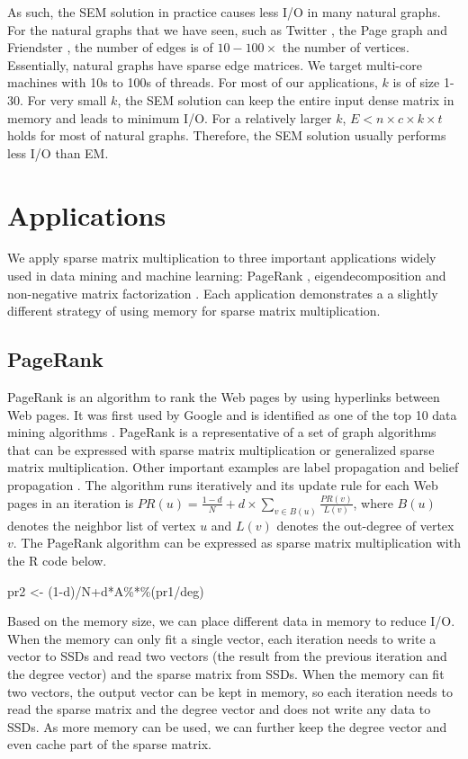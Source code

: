 As such, the SEM solution in practice causes less I/O in many natural graphs.
For the natural graphs that we have seen, such as Twitter \cite{twitter},
the Page graph \cite{web_graph} and Friendster \cite{friendster}, the number
of edges is of $10-100 \times$ the number of vertices. Essentially,
natural graphs have sparse edge matrices. We target multi-core machines with
10s to 100s of threads. For most of our applications, $k$ is of size 1-30.
For very small $k$, the SEM
solution can keep the entire input dense matrix in memory and leads to minimum
I/O. For a relatively larger $k$, $E < n \times c \times k \times t$ holds
for most of natural graphs. Therefore, the SEM solution usually performs less
I/O than EM.

\section{Applications} \label{sec:apps}
We apply sparse matrix multiplication to three important applications widely
used in data mining and machine learning: PageRank \cite{pagerank},
eigendecomposition \cite{anasazi} and non-negative matrix factorization \cite{nmf}.
Each application demonstrates a a slightly different strategy of using memory
for sparse matrix multiplication.

\subsection{PageRank}
PageRank is an algorithm to rank the Web pages by using hyperlinks between Web
pages. It was first used by Google and is identified as one of the top 10 data
mining algorithms \cite{top10}. PageRank is a representative of a set of graph
algorithms that can be expressed with sparse matrix multiplication or generalized
sparse matrix multiplication. Other important examples are label propagation \cite{}
and belief propagation \cite{}. The algorithm runs iteratively and its update
rule for each Web pages in an iteration is
$PR(u) = \frac{1-d}{N} + d \times \sum\limits_{v \in B(u)} \frac{PR(v)}{L(v)}$,
where $B(u)$ denotes the neighbor list of vertex $u$ and $L(v)$ denotes
the out-degree of vertex $v$. The PageRank algorithm can be expressed as sparse
matrix multiplication with the R code below.

pr2 <- (1-d)/N+d*A\%*\%(pr1/deg)

Based on the memory size, we can place different data in memory to reduce I/O.
When the memory can only fit a single vector, each iteration needs
to write a vector to SSDs and read two vectors (the result from
the previous iteration and the degree vector) and the sparse matrix
from SSDs. When the memory can fit two vectors, the output vector can be kept
in memory, so each iteration needs to read the sparse matrix and the degree vector
and does not write any data to SSDs. As more memory can be used, we can
further keep the degree vector and even cache part of the sparse matrix.

